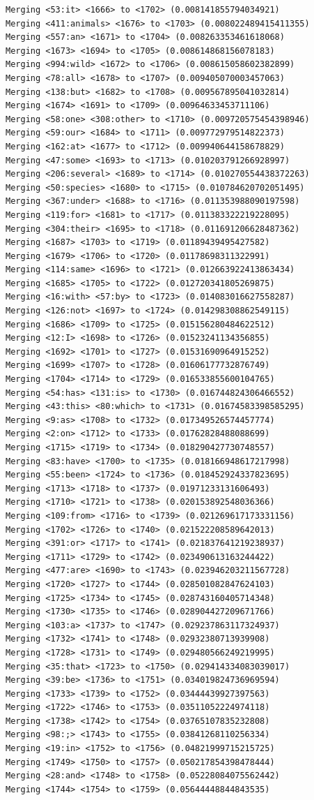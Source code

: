 \documentclass[12pt,a4paper]{article}
\begin{document}
\begin{verbatim}
Merging <53:it> <1666> to <1702> (0.008141855794034921)
Merging <411:animals> <1676> to <1703> (0.008022489415411355)
Merging <557:an> <1671> to <1704> (0.008263353461618068)
Merging <1673> <1694> to <1705> (0.008614868156078183)
Merging <994:wild> <1672> to <1706> (0.008615058602382899)
Merging <78:all> <1678> to <1707> (0.009405070003457063)
Merging <138:but> <1682> to <1708> (0.009567895041032814)
Merging <1674> <1691> to <1709> (0.00964633453711106)
Merging <58:one> <308:other> to <1710> (0.009720575454398946)
Merging <59:our> <1684> to <1711> (0.009772979514822373)
Merging <162:at> <1677> to <1712> (0.009940644158678829)
Merging <47:some> <1693> to <1713> (0.010203791266928997)
Merging <206:several> <1689> to <1714> (0.010270554438372263)
Merging <50:species> <1680> to <1715> (0.010784620702051495)
Merging <367:under> <1688> to <1716> (0.011353988090197598)
Merging <119:for> <1681> to <1717> (0.011383322219228095)
Merging <304:their> <1695> to <1718> (0.011691206628487362)
Merging <1687> <1703> to <1719> (0.01189439495427582)
Merging <1679> <1706> to <1720> (0.01178698311322991)
Merging <114:same> <1696> to <1721> (0.012663922413863434)
Merging <1685> <1705> to <1722> (0.012720341805269875)
Merging <16:with> <57:by> to <1723> (0.014083016627558287)
Merging <126:not> <1697> to <1724> (0.014298308862549115)
Merging <1686> <1709> to <1725> (0.015156280484622512)
Merging <12:I> <1698> to <1726> (0.01523241134356855)
Merging <1692> <1701> to <1727> (0.01531690964915252)
Merging <1699> <1707> to <1728> (0.01606177732876749)
Merging <1704> <1714> to <1729> (0.016533855600104765)
Merging <54:has> <131:is> to <1730> (0.016744824306466552)
Merging <43:this> <80:which> to <1731> (0.01674583398585295)
Merging <9:as> <1708> to <1732> (0.017349526574457774)
Merging <2:on> <1712> to <1733> (0.01762828488088699)
Merging <1715> <1719> to <1734> (0.018290427730748557)
Merging <83:have> <1700> to <1735> (0.018166948617217998)
Merging <55:been> <1724> to <1736> (0.018452924337823695)
Merging <1713> <1718> to <1737> (0.01971233131606493)
Merging <1710> <1721> to <1738> (0.020153892548036366)
Merging <109:from> <1716> to <1739> (0.021269617173331156)
Merging <1702> <1726> to <1740> (0.021522208589642013)
Merging <391:or> <1717> to <1741> (0.021837641219238937)
Merging <1711> <1729> to <1742> (0.023490613163244422)
Merging <477:are> <1690> to <1743> (0.023946203211567728)
Merging <1720> <1727> to <1744> (0.028501082847624103)
Merging <1725> <1734> to <1745> (0.028743160405714348)
Merging <1730> <1735> to <1746> (0.028904427209671766)
Merging <103:a> <1737> to <1747> (0.029237863117324937)
Merging <1732> <1741> to <1748> (0.02932380713939908)
Merging <1728> <1731> to <1749> (0.029480566249219995)
Merging <35:that> <1723> to <1750> (0.029414334083039017)
Merging <39:be> <1736> to <1751> (0.034019824736969594)
Merging <1733> <1739> to <1752> (0.03444439927397563)
Merging <1722> <1746> to <1753> (0.03511052224974118)
Merging <1738> <1742> to <1754> (0.03765107835232808)
Merging <98:;> <1743> to <1755> (0.03841268110256334)
Merging <19:in> <1752> to <1756> (0.04821999715215725)
Merging <1749> <1750> to <1757> (0.050217854398478444)
Merging <28:and> <1748> to <1758> (0.05228084075562442)
Merging <1744> <1754> to <1759> (0.05644448844843535)
\end{verbatim}
\end{document}
